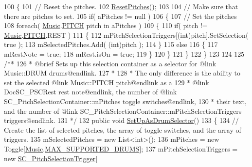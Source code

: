 \begin{DoxyCodeInclude}
100     \{
101         \textcolor{comment}{// Reset the pitches.}
102         \hyperlink{group___s_c___p_s_c_pub_func_ga678ef561c5418e4bf43a5f9ed753f0f0}{ResetPitches}();
103 
104         \textcolor{comment}{// Make sure that there are pitches to set.}
105         \textcolor{keywordflow}{if}( aPitches != null )
106         \{
107             \textcolor{comment}{// Set the pitches}
108             \textcolor{keywordflow}{foreach}( \hyperlink{class_music}{Music}.\hyperlink{group___music_enums_ga508f69b199ea518f935486c990edac1d}{PITCH} pitch in aPitches )
109             \{
110                 \textcolor{keywordflow}{if}( pitch != \hyperlink{class_music}{Music}.\hyperlink{group___music_enums_ga508f69b199ea518f935486c990edac1d}{PITCH}.REST )
111                 \{
112                     mPitchSelectionTriggers[(int)pitch].SetSelection( \textcolor{keyword}{true} );
113                     mSelectedPitches.Add( (\textcolor{keywordtype}{int})pitch );
114                 \}
115                 \textcolor{keywordflow}{else}
116                 \{
117                     mRestNote = \textcolor{keyword}{true};
118                     mRest.isOn = \textcolor{keyword}{true};
119                 \}
120             \}
121         \}
122     \}
123 
124 \textcolor{comment}{}
125 \textcolor{comment}{    /**}
126 \textcolor{comment}{     * @brief Sets up this selection container as a selector for @link Music::DRUM drums@endlink.}
127 \textcolor{comment}{     * }
128 \textcolor{comment}{     * The only difference is the ability to set the selected @link Music::PITCH pitch@endlink as a}
129 \textcolor{comment}{     * @link DocSC\_PSCRest rest note@endlink, the number of @link SC\_PitchSelectionContainer::mPitches
       toggle switches@endlink,}
130 \textcolor{comment}{     * their text, and the number of @link SC\_PitchSelectionContainer::mPitchSelectionTriggers
       triggers@endlink.}
131 \textcolor{comment}{    */}
132     \textcolor{keyword}{public} \textcolor{keywordtype}{void} \hyperlink{group___s_c___p_s_c_pub_func_ga08a0a4943359eb7f28c64aaf4cbc233c}{SetUpAsDrumSelector}()
133     \{
134         \textcolor{comment}{// Create the list of selected pitches, the array of toggle switches, and the array of triggers.}
135         mSelectedPitches = \textcolor{keyword}{new} List<int>();
136         mPitches = \textcolor{keyword}{new} Toggle[\hyperlink{class_music}{Music}.\hyperlink{group___music_constants_gabce1a1ac5b9b6355af6bd7fb3868467a}{MAX\_SUPPORTED\_DRUMS}];
137         mPitchSelectionTriggers = \textcolor{keyword}{new} \hyperlink{class_s_c___pitch_selection_trigger}{SC\_PitchSelectionTrigger}[

\end{DoxyCodeInclude}
